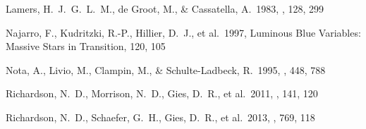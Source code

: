 \documentclass[twocolumn]{aastex62}
\begin{document}
\begin{thebibliography}
 Lamers, H.~J.~G.~L.~M., de Groot, M., \& Cassatella, A.\ 1983, \aap, 128, 299 

 Najarro, F., Kudritzki, R.-P., Hillier, D.~J., et al.\ 1997, Luminous Blue Variables: Massive Stars in Transition, 120, 105  %

 Nota, A., Livio, M., Clampin, M., \& Schulte-Ladbeck, R.\ 1995, \apj, 448, 788 

 Richardson, N.~D., Morrison, N.~D., Gies, D.~R., et al.\ 2011, \aj, 141, 120 

 Richardson, N.~D., Schaefer, G.~H., Gies, D.~R., et al.\ 2013, \apj, 769, 118 

\end{thebibliography}
\end{document}
